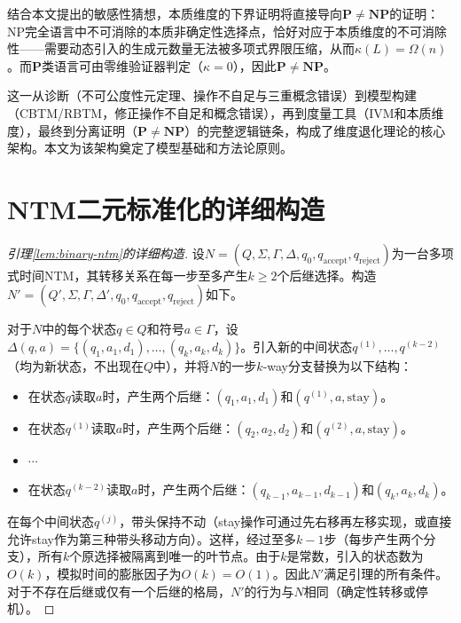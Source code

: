 \documentclass{ctexart}
\newtheorem{proof}[theorem]{证明}
\begin{document}
	结合本文提出的敏感性猜想，本质维度的下界证明将直接导向$\mathbf{P}\neq\mathbf{NP}$的证明：NP完全语言中不可消除的本质非确定性选择点，恰好对应于本质维度的不可消除性——需要动态引入的生成元数量无法被多项式界限压缩，从而$\kappa(L) = \Omega(n)$。而$\mathbf{P}$类语言可由零维验证器判定（$\kappa=0$），因此$\mathbf{P} \neq \mathbf{NP}$。
	
	这一从诊断（不可公度性元定理、操作不自足与三重概念错误）到模型构建（CBTM/RBTM，修正操作不自足和概念错误），再到度量工具（IVM和本质维度），最终到分离证明（$\mathbf{P}\neq\mathbf{NP}$）的完整逻辑链条，构成了维度退化理论的核心架构。本文为该架构奠定了模型基础和方法论原则。
	
	\appendix
	
	\section{NTM二元标准化的详细构造}
	
	\begin{proof}[引理\ref{lem:binary-ntm}的详细构造]
		设$N = (Q, \Sigma, \Gamma, \Delta, q_0, q_{\text{accept}}, q_{\text{reject}})$为一台多项式时间NTM，其转移关系在每一步至多产生$k \ge 2$个后继选择。构造$N' = (Q', \Sigma, \Gamma, \Delta', q_0, q_{\text{accept}}, q_{\text{reject}})$如下。
		
		对于$N$中的每个状态$q \in Q$和符号$a \in \Gamma$，设$\Delta(q,a) = \{(q_1,a_1,d_1), \ldots, (q_k,a_k,d_k)\}$。引入新的中间状态$q^{(1)}, \ldots, q^{(k-2)}$（均为新状态，不出现在$Q$中），并将$N$的一步$k$-way分支替换为以下结构：
		
		\begin{itemize}
			\item 在状态$q$读取$a$时，产生两个后继：$(q_1,a_1,d_1)$和$(q^{(1)},a,\text{stay})$。
			\item 在状态$q^{(1)}$读取$a$时，产生两个后继：$(q_2,a_2,d_2)$和$(q^{(2)},a,\text{stay})$。
			\item $\cdots$
			\item 在状态$q^{(k-2)}$读取$a$时，产生两个后继：$(q_{k-1},a_{k-1},d_{k-1})$和$(q_k,a_k,d_k)$。
		\end{itemize}
		
		在每个中间状态$q^{(j)}$，带头保持不动（stay操作可通过先右移再左移实现，或直接允许stay作为第三种带头移动方向）。这样，经过至多$k-1$步（每步产生两个分支），所有$k$个原选择被隔离到唯一的叶节点。由于$k$是常数，引入的状态数为$O(k)$，模拟时间的膨胀因子为$O(k) = O(1)$。因此$N'$满足引理的所有条件。对于不存在后继或仅有一个后继的格局，$N'$的行为与$N$相同（确定性转移或停机）。
	\end{proof}
	
\end{document}
